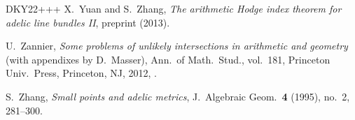 \begin{thebibliography}{DKY22+++}
X.~Yuan and S.~Zhang,
\emph{The arithmetic Hodge index theorem for adelic line bundles II},
preprint  (2013). 

U.~Zannier,
\emph{Some problems of unlikely intersections in arithmetic and geometry} (with appendixes by D.~Masser),
Ann.\ of Math.\ Stud., vol.~181,
Princeton Univ.\ Press, Princeton, NJ, 2012,
.

S.~Zhang,
\emph{Small points and adelic metrics},
J.~Algebraic Geom.\ \textbf{4} (1995), no.~2, 281--300.
\end{thebibliography}
